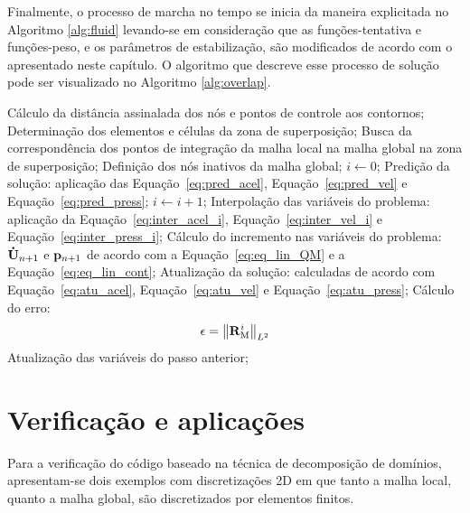 Finalmente, o processo de marcha no tempo se inicia da maneira explicitada no Algoritmo \ref{alg:fluid} levando-se em consideração que as funções-tentativa e funções-peso, e os parâmetros de estabilização, são modificados de acordo com o apresentado neste capítulo. O algoritmo que descreve esse processo de solução pode ser visualizado no Algoritmo \ref{alg:overlap}.

\begin{algorithm}
	\caption{Algoritmo para problemas da DFC com a técnica de partição de domínios por combinação dos espaços de funções}
	\label{alg:overlap}
	\begin{algorithmic}[1]
		\State Cálculo da distância assinalada dos nós e pontos de controle aos contornos;
		\State Determinação dos elementos e células da zona de superposição;
		\State Busca da correspondência dos pontos de integração da malha local na malha global na zona de superposição;
		\State Definição dos nós inativos da malha global;
		\State $i \gets 0$;
		\State Predição da solução: aplicação das Equação~\eqref{eq:pred_acel}, Equação~\eqref{eq:pred_vel} e Equação~\eqref{eq:pred_press};
		\State $i \gets i+1$;
		\State Interpolação das variáveis do problema: aplicação da Equação~\eqref{eq:inter_acel_i}, Equação~\eqref{eq:inter_vel_i} e Equação~\eqref{eq:inter_press_i};
		\State Cálculo do incremento nas variáveis do problema: $\mathbf{\dot{U}}_{n+1}$ e $\mathbf{p}_{n+1}$ de acordo com a Equação~\eqref{eq:eq_lin_QM} e a Equação~\eqref{eq:eq_lin_cont};
		\State Atualização da solução: calculadas de acordo com Equação~\eqref{eq:atu_acel}, Equação~\eqref{eq:atu_vel} e Equação~\eqref{eq:atu_press};
		\State Cálculo do erro:
		\begin{align}
			\epsilon =\left\| \mathbf{R}_\mathrm{M}^i \right\|_{L^2}
		\end{align}
		\EndWhile
		\State Atualização das variáveis do passo anterior;
		\EndFor
	\end{algorithmic}
\end{algorithm}

\section{Verificação e aplicações}

Para a verificação do código baseado na técnica de decomposição de domínios, apresentam-se dois exemplos com discretizações 2D em que tanto a malha local, quanto a malha global, são discretizados por elementos finitos.

